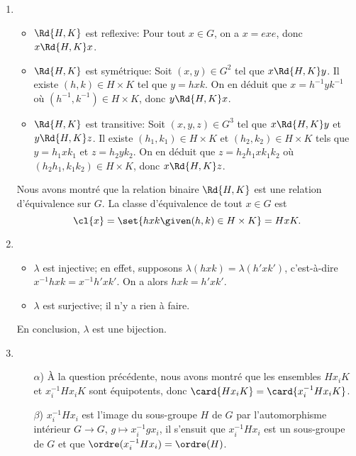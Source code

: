 \begin{enumerate}
  \item
    \begin{itemize}
      \item   
        $\Rd{H,K}$ est reflexive:
        Pour tout $x\in G$, on a $x = exe$, donc $x \Rd{H,K} x$.

      \item
        $\Rd{H,K}$ est symétrique:
        Soit $(x,y)\in G^2$ tel que $x \Rd{H,K} y$. Il existe $(h,k)\in
        H\times K$ tel que $y = hxk$. On en déduit que $x = h^{-1}yk^{-1}$ où
        $(h^{-1},k^{-1})\in H\times K$, donc $y \Rd{H,K} x$.

      \item
        $\Rd{H,K}$ est transitive:
        Soit $(x,y,z)\in G^3$ tel que $x \Rd{H,K} y$ et $y \Rd{H,K} z$. Il
        existe $(h_1,k_1)\in H\times K$ et $(h_2,k_2)\in H\times K$ tels que
        $y = h_1xk_1$ et $z = h_2yk_2$. On en déduit que $z = h_2h_1xk_1k_2$ où
        $(h_2h_1,k_1k_2)\in H\times K$, donc $x \Rd{H,K} z$.
    \end{itemize}

    Nous avons montré que la relation binaire $\Rd{H,K}$ est une relation
    d'équivalence sur $G$. La classe d'équivalence de tout $x\in G$ est
    \[
      \cl{x} = \set{hxk \given (h,k)\in H\times K} = HxK.
    \]

  \item
    \begin{itemize}
      \item
        $\lambda$ est injective; en effet, supposons
        $\lambda(hxk) = \lambda(h'xk')$, c'est-à-dire
        $x^{-1}hxk = x^{-1}h'xk'$. On a alors $hxk = h'xk'$. 

      \item
        $\lambda$ est surjective; il n'y a rien à faire.
    \end{itemize}

    En conclusion, $\lambda$ est une bijection.

  \item
    \begin{enumerate}
      \item[$\alpha$)]
        À la question précédente, nous avons montré que les ensembles 
        $Hx_iK$ et $x_i^{-1}Hx_iK$ sont équipotents, donc 
        $\card{Hx_iK} = \card{x_i^{-1}Hx_iK}$.

      \item[$\beta$)]
        $x_i^{-1}Hx_i$ est l'image du sous-groupe $H$ de $G$ par l'automorphisme
        intérieur $G\to G$, $g\mapsto x_i^{-1}gx_i$, il s'ensuit que
        $x_i^{-1}Hx_i$ est un sous-groupe de $G$ et que
        $\ordre(x_i^{-1}Hx_i)=\ordre(H)$.


\end{enumerate}
\end{enumerate}
